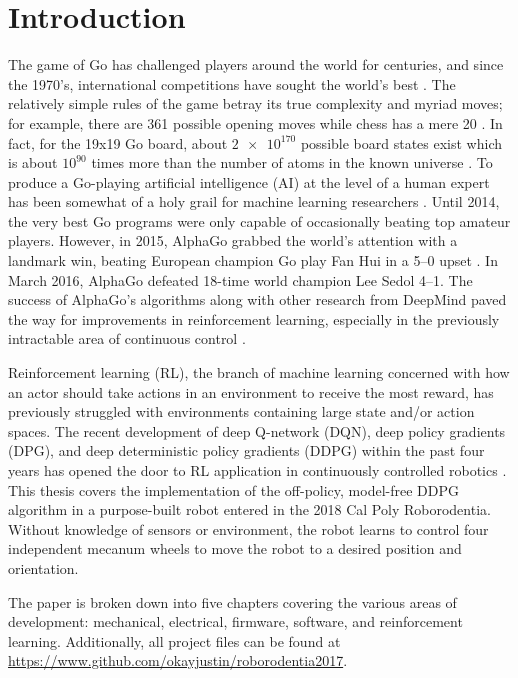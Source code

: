 \chapter{Introduction}
The game of Go has challenged players around the world for centuries, and since the 1970's, international competitions have sought the world's best \cite{go}. The relatively simple rules of the game betray its true complexity and myriad moves; for example, there are 361 possible opening moves while chess has a mere 20 \cite{brit_go}. In fact, for the 19x19 Go board, about $\num{2e170}$ possible board states exist which is about $10^{90}$ times more than the number of atoms in the known universe \cite{go_num}. To produce a Go-playing artificial intelligence (AI) at the level of a human expert has been somewhat of a holy grail for machine learning researchers \cite{brit_go2}. Until 2014, the very best Go programs were only capable of occasionally beating top amateur players. However, in 2015, AlphaGo grabbed the world's attention with a landmark win, beating European champion Go play Fan Hui in a 5--0 upset \cite{brit_go3}. In March 2016, AlphaGo defeated 18-time world champion Lee Sedol 4--1. The success of AlphaGo's algorithms along with other research from DeepMind paved the way for improvements in reinforcement learning, especially in the previously intractable area of continuous control \cite{Mnih_2015}\cite{silver_2017}.

 Reinforcement learning (RL), the branch of machine learning concerned with how an actor should take actions in an environment to receive the most reward, has previously struggled with environments containing large state and/or action spaces. The recent  development of deep Q-network (DQN), deep policy gradients (DPG), and deep deterministic policy gradients (DDPG) within the past four years has opened the door to RL application in continuously controlled robotics  \cite{Mnih_2015}\cite{silver_lever_heess_degris_wierstra_riedmiller}\cite{lillicrap_2016}. This thesis covers the implementation of the off-policy, model-free DDPG algorithm in a purpose-built robot entered in the 2018 Cal Poly Roborodentia. Without knowledge of sensors or environment, the robot learns to control four independent mecanum wheels to move the robot to a desired position and orientation. 
 
 The paper is broken down into five chapters covering the various areas of development: mechanical, electrical, firmware, software, and reinforcement learning. Additionally, all project files can be found at \url{https://www.github.com/okayjustin/roborodentia2017}.


